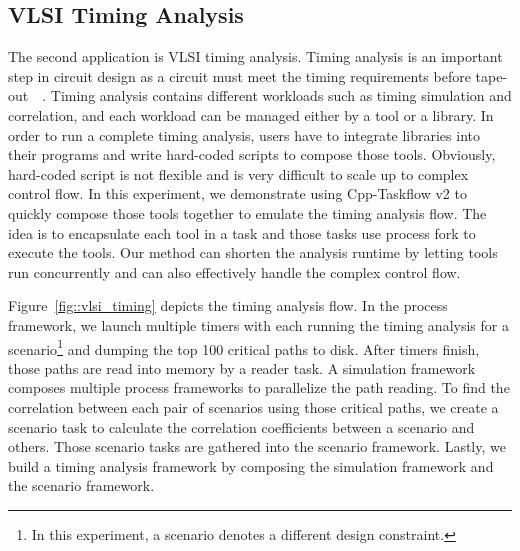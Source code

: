 \documentclass[conference]{IEEEtran}
\begin{document}
\subsection{VLSI Timing Analysis}
The second application is VLSI timing analysis. 
Timing analysis is an important step in 
circuit design as a circuit must meet the timing requirements before 
tape-out~\cite{Huang_16_01}~\cite{Huang_15_01}.  
Timing analysis contains different workloads such as timing simulation and correlation,
and each workload can be managed either by a tool or a library. %
In order to run a complete timing analysis, users have to integrate libraries into their  
programs and write hard-coded scripts to compose those tools.  Obviously,
hard-coded script is not flexible and is very difficult to scale up to complex control flow.  
In this experiment, we demonstrate using Cpp-Taskflow v2 to quickly compose those tools 
together to emulate the timing analysis flow. 
The idea is to encapsulate each tool in a task 
and those tasks use process fork to execute the tools. 
Our method can shorten the analysis runtime by letting tools run concurrently and 
can also effectively handle the complex control flow.   

Figure~\ref{fig::vlsi_timing} depicts the timing analysis flow.
In the process framework, we launch multiple timers
with each running the timing analysis for a scenario\footnote{In this experiment, a scenario 
denotes a different design constraint.} 
and dumping the top 100 critical paths to disk. After timers finish, 
those paths are read into memory by a reader task. 
A simulation framework composes multiple process frameworks to parallelize the
path reading. To find the correlation between each pair of scenarios using
those critical paths, we create a scenario task to calculate the correlation
coefficients between a scenario and others. Those scenario tasks are
gathered into the scenario framework.  Lastly, we build a timing analysis
framework by composing the simulation framework and the scenario framework. 
\end{document}
